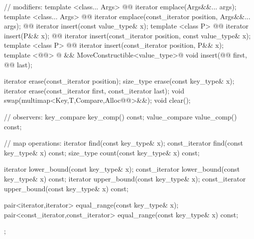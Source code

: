 \documentclass[american,twoside]{book}
\begin{document}
\begin{codeblock}
{{    // modifiers:
    template <class... Args>
      @@
      iterator emplace(Args&&... args);
    template <class... Args> 
      @@
      iterator emplace(const_iterator position, Args&&... args);
    @@ 
      iterator insert(const value_type& x);
    template <class P> 
      @@
      iterator insert(P&& x);
    @@ 
      iterator insert(const_iterator position, const value_type& x);
    template <class P> 
      @@
      iterator insert(const_iterator position, P&& x);
    template <@@>
      @ \&\& MoveConstructible<value_type>@
      void insert(@@ first, @@ last);

    iterator  erase(const_iterator position);
    size_type erase(const key_type& x);
    iterator  erase(const_iterator first, const_iterator last);
    void swap(multimap<Key,T,Compare,Alloc@@>&&);
    void clear();

    // observers:
    key_compare    key_comp() const;
    value_compare  value_comp() const;

    // map operations:
    iterator       find(const key_type& x);
    const_iterator find(const key_type& x) const;
    size_type      count(const key_type& x) const;

    iterator       lower_bound(const key_type& x);
    const_iterator lower_bound(const key_type& x) const;
    iterator       upper_bound(const key_type& x);
    const_iterator upper_bound(const key_type& x) const;

    pair<iterator,iterator>
      equal_range(const key_type& x);
    pair<const_iterator,const_iterator>
      equal_range(const key_type& x) const;
  };

}
\end{codeblock}
\end{document}
